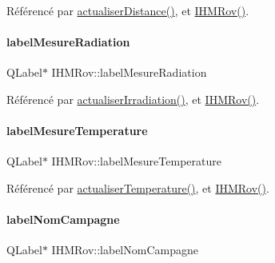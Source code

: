 Référencé par \hyperlink{class_i_h_m_rov_a891d51cf532d9cc8fc56c63a0c61e663}{actualiser\+Distance()}, et \hyperlink{class_i_h_m_rov_a5dac1fb4612866cc61f699a415e0ef6b}{I\+H\+M\+Rov()}.

\mbox{\label{class_i_h_m_rov_aaa9588a64c4af2f9fb08c62519a05c5a}} 
\paragraph{\texorpdfstring{label\+Mesure\+Radiation}{labelMesureRadiation}}
{\footnotesize\ttfamily Q\+Label$\ast$ I\+H\+M\+Rov\+::label\+Mesure\+Radiation\hspace{0.3cm}{\ttfamily [private]}}



Référencé par \hyperlink{class_i_h_m_rov_a9a5108ce8f73fad9a38d02881ec5ae62}{actualiser\+Irradiation()}, et \hyperlink{class_i_h_m_rov_a5dac1fb4612866cc61f699a415e0ef6b}{I\+H\+M\+Rov()}.

\mbox{\label{class_i_h_m_rov_ade64349f20dac7adccee4d4fbc04e6e8}} 
\paragraph{\texorpdfstring{label\+Mesure\+Temperature}{labelMesureTemperature}}
{\footnotesize\ttfamily Q\+Label$\ast$ I\+H\+M\+Rov\+::label\+Mesure\+Temperature\hspace{0.3cm}{\ttfamily [private]}}



Référencé par \hyperlink{class_i_h_m_rov_ae5f2c89b06d7dc09e9974428b14799f1}{actualiser\+Temperature()}, et \hyperlink{class_i_h_m_rov_a5dac1fb4612866cc61f699a415e0ef6b}{I\+H\+M\+Rov()}.

\mbox{\label{class_i_h_m_rov_a723334735d6a20ea43f79567892cfd25}} 
\paragraph{\texorpdfstring{label\+Nom\+Campagne}{labelNomCampagne}}
{\footnotesize\ttfamily Q\+Label$\ast$ I\+H\+M\+Rov\+::label\+Nom\+Campagne\hspace{0.3cm}{\ttfamily [private]}}



